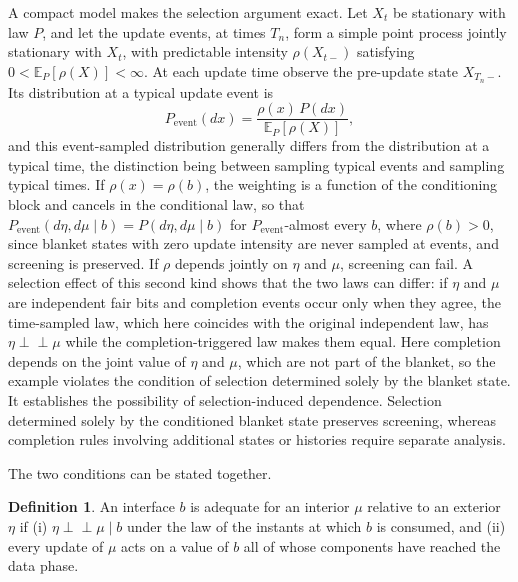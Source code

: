 \documentclass[11pt]{article}
\theoremstyle{definition}
\newtheorem{definition}{Definition}
\newcommand{\Ind}{\perp\!\!\!\perp}
\begin{document}
A compact model makes the selection argument exact. Let $X_t$ be stationary with law $P$, and let the update events, at times $T_n$, form a simple point process jointly stationary with $X_t$, with predictable intensity $\rho(X_{t-})$ satisfying $0<\mathbb E_P[\rho(X)]<\infty$. At each update time observe the pre-update state $X_{T_n-}$. Its distribution at a typical update event is
\[
P_{\mathrm{event}}(dx)=\frac{\rho(x)\,P(dx)}{\mathbb E_P[\rho(X)]},
\]
and this event-sampled distribution generally differs from the distribution at a typical time, the distinction being between sampling typical events and sampling typical times. If $\rho(x)=\rho(b)$, the weighting is a function of the conditioning block and cancels in the conditional law, so that $P_{\mathrm{event}}(d\eta,d\mu\mid b)=P(d\eta,d\mu\mid b)$ for $P_{\mathrm{event}}$-almost every $b$, where $\rho(b)>0$, since blanket states with zero update intensity are never sampled at events, and screening is preserved. If $\rho$ depends jointly on $\eta$ and $\mu$, screening can fail. A selection effect of this second kind shows that the two laws can differ: if $\eta$ and $\mu$ are independent fair bits and completion events occur only when they agree, the time-sampled law, which here coincides with the original independent law, has $\eta\Ind\mu$ while the completion-triggered law makes them equal. Here completion depends on the joint value of $\eta$ and $\mu$, which are not part of the blanket, so the example violates the condition of selection determined solely by the blanket state. It establishes the possibility of selection-induced dependence. Selection determined solely by the conditioned blanket state preserves screening, whereas completion rules involving additional states or histories require separate analysis.

The two conditions can be stated together.

\begin{definition}
An interface $b$ is adequate for an interior $\mu$ relative to an exterior $\eta$ if (i) $\eta\Ind\mu\mid b$ under the law of the instants at which $b$ is consumed, and (ii) every update of $\mu$ acts on a value of $b$ all of whose components have reached the data phase.
\end{definition}
\end{document}
